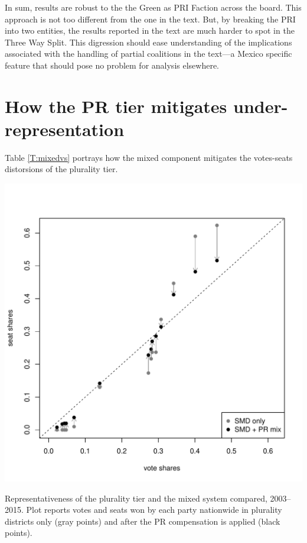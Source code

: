 \documentclass[letter,12pt]{article}
\begin{document}
In sum, results are robust to the the Green as PRI Faction across the board. This approach is not too different from the one in the text. But, by breaking the PRI into two entities, the results reported in the text are much harder to spot in the Three Way Split. This digression should ease understanding of the implications associated with the handling of partial coalitions in the text---a Mexico specific feature that should pose no problem for analysis elsewhere. 

\section{How the PR tier mitigates under-representation}

Table \ref{T:mixedvs} portrays how the mixed component mitigates the votes-seats distorsions of the plurality tier.

\begin{table}
\centering
\includegraphics[width=.8\columnwidth]{votes-seatsSMDandMix0612.pdf}
\caption{Representativeness of the plurality tier and the mixed system compared, 2003--2015. Plot reports votes and seats won by each party nationwide in plurality districts only (gray points) and after the PR compensation is applied (black points).}\label{T:mixedvs}
\end{table}






%

\end{document}
